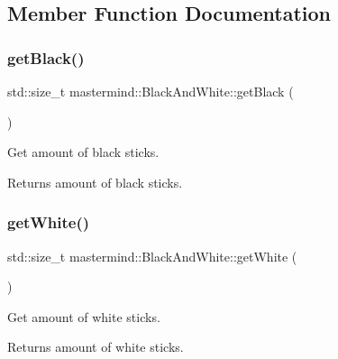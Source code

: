 \subsection{Member Function Documentation}
\hypertarget{classmastermind_1_1_black_and_white_a470f5b3e118ca8da4d5bfb484505d0c8}{}\label{classmastermind_1_1_black_and_white_a470f5b3e118ca8da4d5bfb484505d0c8} 
\subsubsection{\texorpdfstring{get\+Black()}{getBlack()}}
{\footnotesize\ttfamily std\+::size\+\_\+t mastermind\+::\+Black\+And\+White\+::get\+Black (\begin{DoxyParamCaption}{ }\end{DoxyParamCaption})}



Get amount of black sticks. 

\begin{DoxyReturn}{Returns}
amount of black sticks. 
\end{DoxyReturn}
\hypertarget{classmastermind_1_1_black_and_white_a70cbebcdb3ad3f8708727ef51aef724f}{}\label{classmastermind_1_1_black_and_white_a70cbebcdb3ad3f8708727ef51aef724f} 
\subsubsection{\texorpdfstring{get\+White()}{getWhite()}}
{\footnotesize\ttfamily std\+::size\+\_\+t mastermind\+::\+Black\+And\+White\+::get\+White (\begin{DoxyParamCaption}{ }\end{DoxyParamCaption})}



Get amount of white sticks. 

\begin{DoxyReturn}{Returns}
amount of white sticks. 
\end{DoxyReturn}
\hypertarget{classmastermind_1_1_black_and_white_a706941b33714b6764811e14780183ed9}{}\label{classmastermind_1_1_black_and_white_a706941b33714b6764811e14780183ed9} 

